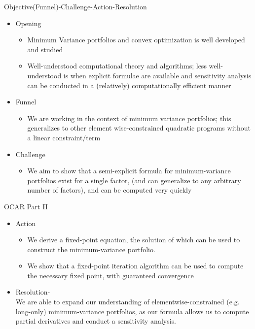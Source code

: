 \documentclass[11pt,leqno]{beamer}
\begin{document}
\begin{frame}{Objective(Funnel)-Challenge-Action-Resolution}
\begin{itemize}
\item Opening
\begin{itemize}
\item Minimum Variance portfolios and convex optimization is well developed and studied
\item Well-understood computational theory and algorithms; less well-understood is when explicit formulae are available and sensitivity analysis can be conducted in a (relatively) computationally efficient manner
\end{itemize}
\item Funnel
\begin{itemize}
\item We are working in the context of minimum variance portfolios; this generalizes to other element wise-constrained quadratic programs without a linear constraint/term
\end{itemize}
\item Challenge
\begin{itemize}
\item We aim to show that a semi-explicit formula for minimum-variance portfolios exist for a single factor, (and can generalize to any arbitrary number of factors), and can be computed very quickly
\end{itemize}
\end{itemize}
\end{frame}

\begin{frame}{OCAR Part II}
\begin{itemize}
\item Action
\begin{itemize}
\item We derive a fixed-point equation, the solution of which can be used to construct the minimum-variance portfolio.  
\item We show that a fixed-point iteration algorithm can be used to compute the necessary fixed point, with guaranteed convergence
\end{itemize}
\item Resolution-\\
We are able to expand our understanding of elementwise-constrained (e.g. long-only) minimum-variance portfolios, as our formula allows us to compute partial derivatives and conduct a sensitivity analysis.
\end{itemize}
\end{frame}
\end{document}
